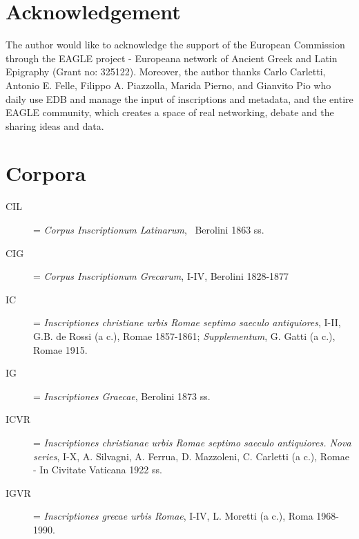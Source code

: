 \documentclass[amsthm,ebook]{saparticle}
\begin{document}
\nocite{felle_fenomeni_2007}
\nocite{felle_esperienze_2012}
\nocite{jory_problems_1975}
\nocite{Rocco2015a}

\section*{Acknowledgement}
The author would like to acknowledge the support of the European Commission through the
EAGLE project - Europeana network of Ancient Greek and Latin Epigraphy (Grant no: 325122). Moreover, the author thanks
Carlo Carletti, Antonio E. Felle, Filippo A. Piazzolla, Marida Pierno, and Gianvito Pio who daily use EDB and manage
the input of inscriptions and metadata, and the entire EAGLE community, which creates a space of real networking,
debate and the sharing ideas and data.

\section*{Corpora}
\begin{description}
\item[CIL] = \emph{Corpus Inscriptionum Latinarum}, \ Berolini 1863 ss.
\item[CIG] = \emph{Corpus Inscriptionum Grecarum}, I-IV, Berolini 1828-1877
\item[IC] = \emph{Inscriptiones christiane urbis Romae septimo saeculo antiquiores}, I-II, G.B. de Rossi (a c.), Romae 1857-1861; \emph{Supplementum}, G. Gatti (a c.), Romae 1915. 
\item[IG] = \emph{Inscriptiones Graecae}, Berolini 1873 ss.
\item[ICVR] = \emph{Inscriptiones christianae urbis Romae septimo saeculo antiquiores. Nova series}, I-X, A. Silvagni, A. Ferrua, D. Mazzoleni, C. Carletti (a c.), Romae - In Civitate Vaticana 1922 ss.
\item[IGVR] = \emph{Inscriptiones grecae urbis Romae}, I-IV, L. Moretti (a c.), Roma 1968-1990. 

\end{description}



\end{document}
